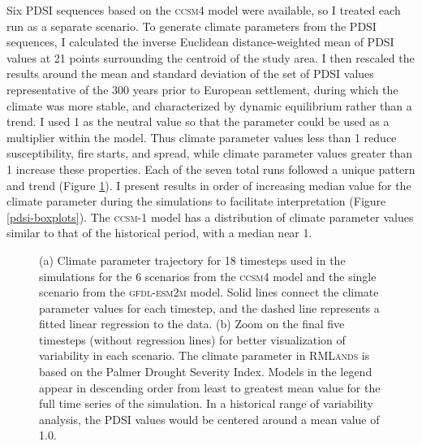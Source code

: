 Six PDSI sequences based on the \textsc{ccsm4} model were available, so I treated each run as a separate scenario. To generate climate parameters from the PDSI sequences, I calculated the inverse Euclidean distance-weighted mean of PDSI values at 21 points surrounding the centroid of the study area. I then rescaled the results around the mean and standard deviation of the set of PDSI values representative of the 300 years prior to European settlement, during which the climate was more stable, and characterized by dynamic equilibrium rather than a trend. I used 1 as the neutral value so that the parameter could be used as a multiplier within the model. Thus climate parameter values less than 1 reduce susceptibility, fire starts, and spread, while climate parameter values greater than 1 increase these properties. Each of the seven total runs followed a unique pattern and trend (Figure \ref{fig:pdsi_future}). I present results in order of increasing median value for the climate parameter during the simulations to facilitate interpretation (Figure \ref{pdsi-boxplots}). The \textsc{ccsm-1} model has a distribution of climate parameter values similar to that of the historical period, with a median near 1.


\begin{figure}[!htbp]
\centering
    \caption{(a) Climate parameter trajectory for 18 timesteps used in the simulations for the 6 scenarios from the \textsc{ccsm4} model and the single scenario from the \textsc{gfdl-esm2m} model. Solid lines connect the climate parameter values for each timestep, and the dashed line represents a fitted linear regression to the data. (b) Zoom on the final five timesteps (without regression lines) for better visualization of variability in each scenario. The climate parameter in \textsc{RMLands} is based on the Palmer Drought Severity Index. Models in the legend appear in descending order from least to greatest mean value for the full time series of the simulation. In a historical range of variability analysis, the PDSI values would be centered around a mean value of 1.0.}
\label{fig:pdsi_future}

\end{figure}

